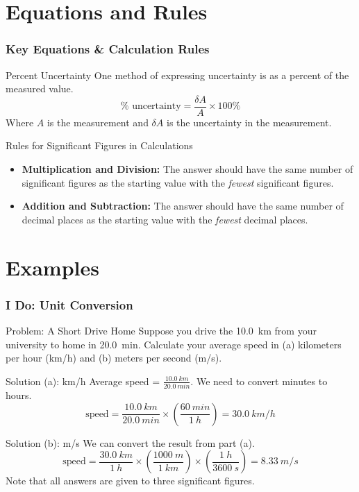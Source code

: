 \documentclass{beamer}
\begin{document}
\section{Equations and Rules}
\begin{frame}
    \frametitle{Key Equations \& Calculation Rules}
    \begin{block}{Percent Uncertainty}
        One method of expressing uncertainty is as a percent of the measured value.
        \[ \% \text{ uncertainty} = \frac{\delta A}{A} \times 100\% \]
        Where \(A\) is the measurement and \(\delta A\) is the uncertainty in the measurement.
    \end{block}
    \begin{block}{Rules for Significant Figures in Calculations}
        \begin{itemize}
            \item \textbf{Multiplication and Division:} The answer should have the same number of significant figures as the starting value with the \textit{fewest} significant figures.
            \item \textbf{Addition and Subtraction:} The answer should have the same number of decimal places as the starting value with the \textit{fewest} decimal places.
        \end{itemize}
    \end{block}
\end{frame}

\section{Examples}
\begin{frame}
    \frametitle{I Do: Unit Conversion}
    \begin{exampleblock}{Problem: A Short Drive Home}
        Suppose you drive the \SI{10.0}{km} from your university to home in \SI{20.0}{min}. Calculate your average speed in (a) kilometers per hour (km/h) and (b) meters per second (m/s).
    \end{exampleblock}
    \begin{block}{Solution (a): km/h}
        Average speed = \(\frac{\SI{10.0}{km}}{\SI{20.0}{min}}\). We need to convert minutes to hours.
        \[ \text{speed} = \frac{\SI{10.0}{km}}{\SI{20.0}{min}} \times \left( \frac{\SI{60}{min}}{\SI{1}{h}} \right) = \SI{30.0}{km/h} \]
    \end{block}
    \begin{block}{Solution (b): m/s}
        We can convert the result from part (a).
        \[ \text{speed} = \frac{\SI{30.0}{km}}{\SI{1}{h}} \times \left( \frac{\SI{1000}{m}}{\SI{1}{km}} \right) \times \left( \frac{\SI{1}{h}}{\SI{3600}{s}} \right) = \SI{8.33}{m/s} \]
        Note that all answers are given to three significant figures.
    \end{block}
\end{frame}
\end{document}

